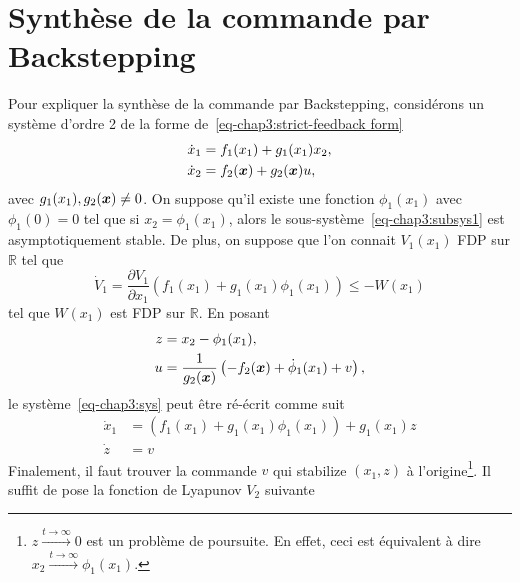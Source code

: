 \section{Synthèse de la commande par Backstepping}
Pour expliquer la synthèse de la commande par Backstepping, considérons un système d'ordre 2 de la forme de~\eqref{eq-chap3:strict-feedback form}
	\begin{subequations}\label{eq-chap3:sys}
		\begin{align}
			\label{eq-chap3:subsys1}	\dot{x}_1 &= f_1(x_1) + g_1(x_1)x_2,\\
			\label{eq-chap3:subsys2}	\dot{x}_2 &= f_2(\bm{x}) + g_2(\bm{x})u,
		\end{align}
	\end{subequations}
avec $g_1(x_1),g_2(\bm{x})\neq0$. On suppose qu'il existe une fonction $\phi_1(x_1)$ avec $\phi_1(0)=0$ tel que si $x_2 = \phi_1(x_1)$, alors le sous-système~\eqref{eq-chap3:subsys1} est asymptotiquement stable. De plus, on suppose que l'on connait $V_1(x_1)$ FDP sur $\mathbb{R}$ tel que 
\begin{equation}
	\dot{V}_1=\frac{\partial V_1}{\partial x_1}\left(f_1(x_1) + g_1(x_1)\phi_1(x_1)\right)\leq - W(x_1)
\end{equation}
tel que $W(x_1)$ est FDP sur $\mathbb{R}$. En posant 
\begin{align*}
	z&=x_2-\phi_1(x_1),\\
	u &= \frac{1}{g_2(\bm{x})}\left(-f_2(\bm{x}) +\dot{\phi}_1(x_1) + v\right),
\end{align*}
  le système~\eqref{eq-chap3:sys} peut être ré-écrit comme suit 
	\begin{subequations}\label{eq-chap3:sys_modif}
	\begin{align}
			\dot{x}_1 &= \left(f_1(x_1) + g_1(x_1)\phi_1(x_1)\right) + g_1(x_1)z\\
			\dot{z} &= v
	\end{align}
	\end{subequations}
Finalement, il faut trouver la commande $v$ qui stabilize  $(x_1,z)$ à l'origine\footnote{$z\overset{t\rightarrow\infty}{\longrightarrow}0$ est un problème de poursuite. En effet, ceci est équivalent à dire $ x_2\overset{t\rightarrow\infty}{\longrightarrow}\phi_1(x_1)$.}. Il suffit de pose la fonction de Lyapunov $V_2$ suivante 
